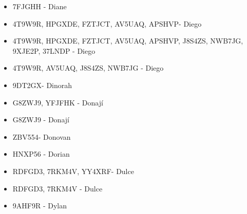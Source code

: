 \begin{itemize}[leftmargin=*,nosep]
\item 7FJGHH - Diane
\item 4T9W9R, HPGXDE, FZTJCT, AV5UAQ, APSHVP- Diego
\item 4T9W9R, HPGXDE, FZTJCT, AV5UAQ, APSHVP, J8S4ZS, NWB7JG, 9XJE2P, 37LNDP - Diego
\item 4T9W9R, AV5UAQ, J8S4ZS, NWB7JG - Diego
\item 9DT2GX- Dinorah
\item G8ZWJ9, YFJFHK - Donají
\item G8ZWJ9 - Donají
\item ZBV554- Donovan
\item HNXP56 - Dorian
\item RDFGD3, 7RKM4V, YY4XRF- Dulce
\item RDFGD3, 7RKM4V - Dulce
\item 9AHF9R - Dylan
\end{itemize}

